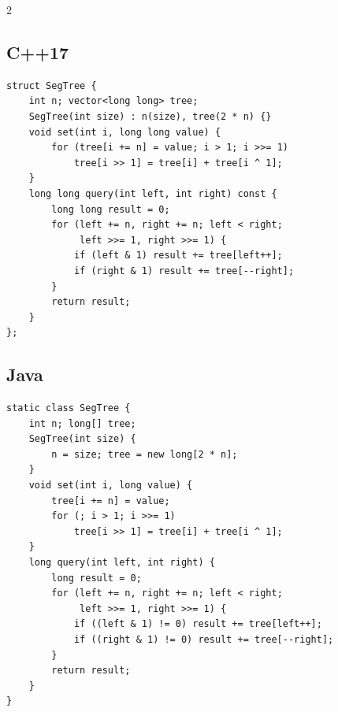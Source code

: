 \documentclass[10pt]{article}
\begin{document}
\begin{multicols}{2}
\subsection{C++17}
\begin{framed}
\scriptsize
\begin{verbatim}
struct SegTree {
    int n; vector<long long> tree;
    SegTree(int size) : n(size), tree(2 * n) {}
    void set(int i, long long value) {
        for (tree[i += n] = value; i > 1; i >>= 1)
            tree[i >> 1] = tree[i] + tree[i ^ 1];
    }
    long long query(int left, int right) const {
        long long result = 0;
        for (left += n, right += n; left < right;
             left >>= 1, right >>= 1) {
            if (left & 1) result += tree[left++];
            if (right & 1) result += tree[--right];
        }
        return result;
    }
};
\end{verbatim}
\end{framed}

\subsection{Java}
\begin{framed}
\scriptsize
\begin{verbatim}
static class SegTree {
    int n; long[] tree;
    SegTree(int size) {
        n = size; tree = new long[2 * n];
    }
    void set(int i, long value) {
        tree[i += n] = value;
        for (; i > 1; i >>= 1)
            tree[i >> 1] = tree[i] + tree[i ^ 1];
    }
    long query(int left, int right) {
        long result = 0;
        for (left += n, right += n; left < right;
             left >>= 1, right >>= 1) {
            if ((left & 1) != 0) result += tree[left++];
            if ((right & 1) != 0) result += tree[--right];
        }
        return result;
    }
}
\end{verbatim}
\end{framed}

\end{multicols}
\newpage
\end{document}
